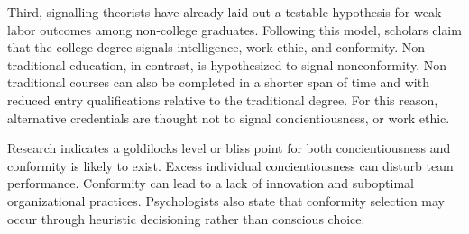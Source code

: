 \documentclass[review]{elsarticle}
\begin{document}
Third, signalling theorists have already laid out a testable hypothesis for weak labor outcomes among non-college graduates.
Following this model, scholars claim that the college degree signals intelligence, work ethic, and conformity\cite{caplan2018case}.
Non-traditional education, in contrast, is hypothesized to signal nonconformity.
Non-traditional courses can also be completed in a shorter span of time and with reduced entry qualifications relative to the traditional degree.
For this reason, alternative credentials are thought not to signal concientiousness, or work ethic.





Research indicates a goldilocks level or bliss point for both concientiousness and conformity is likely to exist.
Excess individual concientiousness can disturb team performance\cite{curcseu2019personality}.
Conformity can lead to a lack of innovation and suboptimal organizational practices\cite{symon2006neglected}.
Psychologists also state that conformity selection may occur through heuristic decisioning rather than conscious choice.
\end{document}
